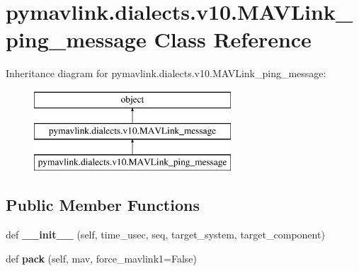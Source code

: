 \hypertarget{classpymavlink_1_1dialects_1_1v10_1_1MAVLink__ping__message}{}\section{pymavlink.\+dialects.\+v10.\+M\+A\+V\+Link\+\_\+ping\+\_\+message Class Reference}
\label{classpymavlink_1_1dialects_1_1v10_1_1MAVLink__ping__message}
Inheritance diagram for pymavlink.\+dialects.\+v10.\+M\+A\+V\+Link\+\_\+ping\+\_\+message\+:\begin{figure}[H]
\begin{center}
\leavevmode
\includegraphics[height=3.000000cm]{classpymavlink_1_1dialects_1_1v10_1_1MAVLink__ping__message}
\end{center}
\end{figure}
\subsection*{Public Member Functions}
\begin{DoxyCompactItemize}
\item 
\mbox{\label{classpymavlink_1_1dialects_1_1v10_1_1MAVLink__ping__message_a8d52dc9933f68a95b2be84aa2f2da4c9}} 
def {\bfseries \+\_\+\+\_\+init\+\_\+\+\_\+} (self, time\+\_\+usec, seq, target\+\_\+system, target\+\_\+component)
\item 
\mbox{\label{classpymavlink_1_1dialects_1_1v10_1_1MAVLink__ping__message_ad1747afaa32214c0ab0884ae6051fa0c}} 
def {\bfseries pack} (self, mav, force\+\_\+mavlink1=False)
\end{DoxyCompactItemize}
